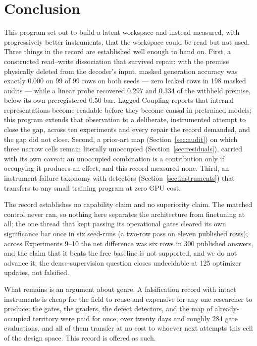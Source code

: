 \documentclass[10pt,a4paper]{article}
\begin{document}
\section{Conclusion}\label{sec:conclusion}

This program set out to build a latent workspace and instead measured, with progressively better instruments, that the workspace could be read but not used. Three things in the record are established well enough to hand on. First, a constructed read--write dissociation that survived repair: with the premise physically deleted from the decoder's input, masked generation accuracy was exactly 0.000 on 99 of 99 rows on both seeds --- zero leaked rows in 198 masked audits --- while a linear probe recovered 0.297 and 0.334 of the withheld premise, below its own preregistered 0.50 bar. Lagged Coupling \cite{xun2026lagged} reports that internal representations become readable before they become causal in pretrained models; this program extends that observation to a deliberate, instrumented attempt to close the gap, across ten experiments and every repair the record demanded, and the gap did not close. Second, a prior-art map (Section~\ref{sec:audit}) on which three narrow cells remain literally unoccupied (Section~\ref{sec:residuals}), carried with its own caveat: an unoccupied combination is a contribution only if occupying it produces an effect, and this record measured none. Third, an instrument-failure taxonomy with detectors (Section~\ref{sec:instruments}) that transfers to any small training program at zero GPU cost.

The record establishes no capability claim and no superiority claim. The matched control never ran, so nothing here separates the architecture from finetuning at all; the one thread that kept passing its operational gates cleared its own significance bar once in six seed-runs (a two-row pass on eleven published rows); across Experiments 9--10 the net difference was six rows in 300 published answers, and the claim that it beats the free baseline is not supported, and we do not advance it; the dense-supervision question closes undecidable at 125 optimizer updates, not falsified.

What remains is an argument about genre. A falsification record with intact instruments is cheap for the field to reuse and expensive for any one researcher to produce: the gates, the graders, the defect detectors, and the map of already-occupied territory were paid for once, over twenty days and roughly 284 gate evaluations, and all of them transfer at no cost to whoever next attempts this cell of the design space. This record is offered as such.
\end{document}
